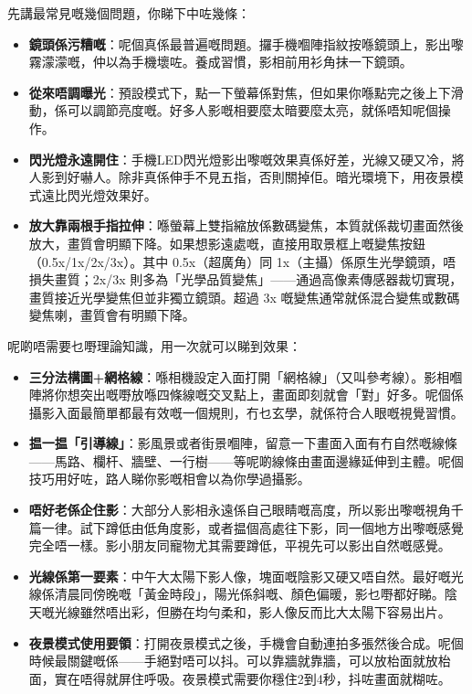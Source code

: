 


先講最常見嘅幾個問題，你睇下中咗幾條：

\begin{itemize}
  \item \textbf{鏡頭係污糟嘅}：呢個真係最普遍嘅問題。攞手機嗰陣指紋按喺鏡頭上，影出嚟霧濛濛嘅，仲以為手機壞咗。養成習慣，影相前用衫角抹一下鏡頭。
  \item \textbf{從來唔調曝光}：預設模式下，點一下螢幕係對焦，但如果你喺點完之後上下滑動，係可以調節亮度嘅。好多人影嘅相要麼太暗要麼太亮，就係唔知呢個操作。
  \item \textbf{閃光燈永遠開住}：手機LED閃光燈影出嚟嘅效果真係好差，光線又硬又冷，將人影到好嚇人。除非真係伸手不見五指，否則關掉佢。暗光環境下，用夜景模式遠比閃光燈效果好。
  \item \textbf{放大靠兩根手指拉伸}：喺螢幕上雙指縮放係數碼變焦，本質就係裁切畫面然後放大，畫質會明顯下降。如果想影遠處嘅，直接用取景框上嘅變焦按鈕（0.5x/1x/2x/3x）。其中 0.5x（超廣角）同 1x（主攝）係原生光學鏡頭，唔損失畫質；2x/3x 則多為「光學品質變焦」——通過高像素傳感器裁切實現，畫質接近光學變焦但並非獨立鏡頭。超過 3x 嘅變焦通常就係混合變焦或數碼變焦喇，畫質會有明顯下降。
\end{itemize}


呢啲唔需要乜嘢理論知識，用一次就可以睇到效果：

\begin{itemize}
  \item \textbf{三分法構圖+網格線}：喺相機設定入面打開「網格線」（又叫參考線）。影相嗰陣將你想突出嘅嘢放喺四條線嘅交叉點上，畫面即刻就會「對」好多。呢個係攝影入面最簡單都最有效嘅一個規則，冇乜玄學，就係符合人眼嘅視覺習慣。
  \item \textbf{揾一揾「引導線」}：影風景或者街景嗰陣，留意一下畫面入面有冇自然嘅線條——馬路、欄杆、牆壁、一行樹——等呢啲線條由畫面邊緣延伸到主體。呢個技巧用好咗，路人睇你影嘅相會以為你學過攝影。
  \item \textbf{唔好老係企住影}：大部分人影相永遠係自己眼睛嘅高度，所以影出嚟嘅視角千篇一律。試下蹲低由低角度影，或者揾個高處往下影，同一個地方出嚟嘅感覺完全唔一樣。影小朋友同寵物尤其需要蹲低，平視先可以影出自然嘅感覺。
  \item \textbf{光線係第一要素}：中午大太陽下影人像，塊面嘅陰影又硬又唔自然。最好嘅光線係清晨同傍晚嘅「黃金時段」，陽光係斜嘅、顏色偏暖，影乜嘢都好睇。陰天嘅光線雖然唔出彩，但勝在均勻柔和，影人像反而比大太陽下容易出片。
  \item \textbf{夜景模式使用要領}：打開夜景模式之後，手機會自動連拍多張然後合成。呢個時候最關鍵嘅係——手絕對唔可以抖。可以靠牆就靠牆，可以放枱面就放枱面，實在唔得就屏住呼吸。夜景模式需要你穩住2到4秒，抖咗畫面就糊咗。
\end{itemize}

